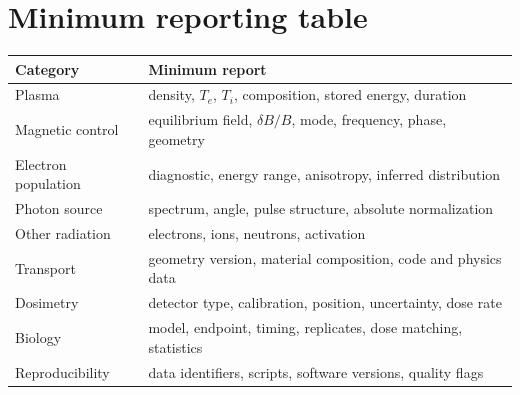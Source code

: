 \section{Minimum reporting table}

\begin{longtable}{p{}p{}}
\toprule
Category & Minimum report \\
\midrule
Plasma & density, $T_e$, $T_i$, composition, stored energy, duration \\
Magnetic control & equilibrium field, $\delta B/B$, mode, frequency, phase, geometry \\
Electron population & diagnostic, energy range, anisotropy, inferred distribution \\
Photon source & spectrum, angle, pulse structure, absolute normalization \\
Other radiation & electrons, ions, neutrons, activation \\
Transport & geometry version, material composition, code and physics data \\
Dosimetry & detector type, calibration, position, uncertainty, dose rate \\
Biology & model, endpoint, timing, replicates, dose matching, statistics \\
Reproducibility & data identifiers, scripts, software versions, quality flags \\
\bottomrule
\end{longtable}

